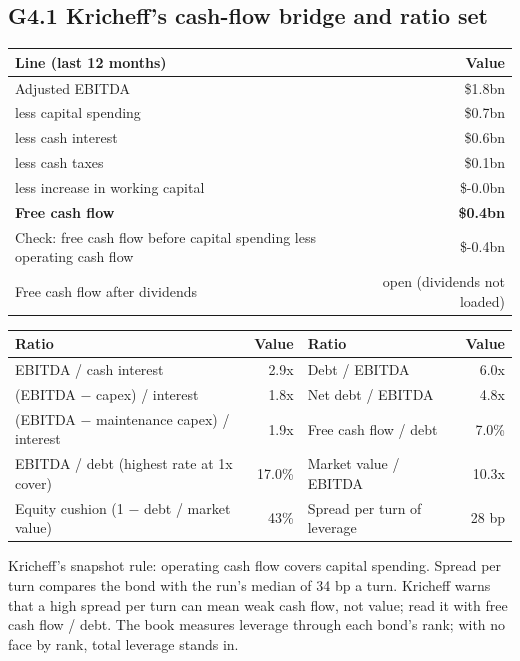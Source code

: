 \documentclass[11pt,a4paper]{article}
\begin{document}
\subsection*{G4.1 Kricheff's cash-flow bridge and ratio set}
\begin{center}\footnotesize\setlength{\tabcolsep}{3.5pt}\begin{tabular}{@{}lr@{}}\toprule
Line (last 12 months) & Value \\\midrule
Adjusted EBITDA & \$1.8bn \\
less capital spending & \$0.7bn \\
less cash interest & \$0.6bn \\
less cash taxes & \$0.1bn \\
less increase in working capital & \$-0.0bn \\
\textbf{Free cash flow} & \textbf{\$0.4bn} \\
Check: free cash flow before capital spending less operating cash flow & \$-0.4bn \\
Free cash flow after dividends & open (dividends not loaded) \\
\bottomrule\end{tabular}\end{center}
\begin{center}\footnotesize\setlength{\tabcolsep}{3.5pt}\begin{tabular}{@{}lrlr@{}}\toprule
Ratio & Value & Ratio & Value \\\midrule
EBITDA / cash interest & 2.9x & Debt / EBITDA & 6.0x \\
(EBITDA $-$ capex) / interest & 1.8x & Net debt / EBITDA & 4.8x \\
(EBITDA $-$ maintenance capex) / interest & 1.9x & Free cash flow / debt & 7.0\% \\
EBITDA / debt (highest rate at 1x cover) & 17.0\% & Market value / EBITDA & 10.3x \\
Equity cushion (1 $-$ debt / market value) & 43\% & Spread per turn of leverage & 28 bp \\
\bottomrule\end{tabular}\end{center}
Kricheff's snapshot rule: operating cash flow covers capital spending. Spread per turn compares the bond with the run's median of 34 bp a turn. Kricheff warns that a high spread per turn can mean weak cash flow, not value; read it with free cash flow / debt. The book measures leverage through each bond's rank; with no face by rank, total leverage stands in.
\end{document}
